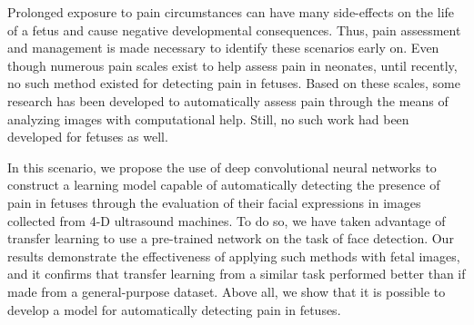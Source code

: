 Prolonged exposure to pain circumstances can have many side-effects on the life of a fetus and cause negative developmental consequences. Thus, pain assessment and management is made necessary to identify these scenarios early on. Even though numerous pain scales exist to help assess pain in neonates, until recently, no such method existed for detecting pain in fetuses. Based on these scales, some research has been developed to automatically assess pain through the means of analyzing images with computational help. Still, no such work had been developed for fetuses as well.

In this scenario, we propose the use of deep convolutional neural networks to construct a learning model capable of automatically detecting the presence of pain in fetuses through the evaluation of their facial expressions in images collected from 4-D ultrasound machines. To do so, we have taken advantage of transfer learning to use a pre-trained network on the task of face detection. Our results demonstrate the effectiveness of applying such methods with fetal images, and it confirms that transfer learning from a similar task performed better than if made from a general-purpose dataset. Above all, we show that it is possible to develop a model for automatically detecting pain in fetuses.

